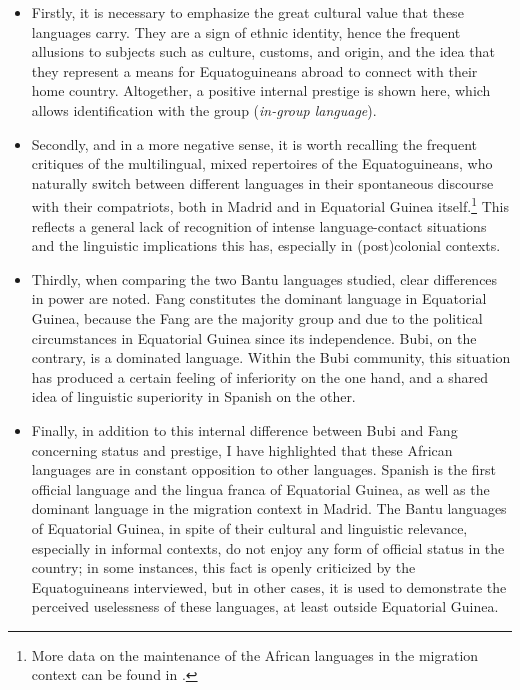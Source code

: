 \documentclass[output=paper]{langscibook}
\begin{document}
\begin{itemize}
\item Firstly, it is necessary to emphasize the great cultural value that these languages carry. They are a sign of ethnic identity, hence the frequent allusions to subjects such as culture, customs, and origin, and the idea that they represent a means for Equatoguineans abroad to connect with their home country. Altogether, a positive internal prestige is shown here, which allows identification with the group (\textit{in-group language}).
\sloppy
\item Secondly, and in a more negative sense, it is worth recalling the frequent critiques of the multilingual, mixed repertoires of the Equatoguineans, who naturally switch between different languages in their spontaneous discourse with their compatriots, both in Madrid and in Equatorial Guinea itself.\footnote{More data on the maintenance of the African languages in the migration context can be found in \citet{schlumpf_african_2020}.} This reflects a general lack of recognition of intense language-contact situations and the linguistic implications this has, especially in (post)colonial contexts.
\item Thirdly, when comparing the two Bantu languages studied, clear differences in power are noted. Fang constitutes the dominant language in Equatorial Guinea, because the Fang are the majority group and due to the political circumstances in Equatorial Guinea since its independence. Bubi, on the contrary, is a dominated language. Within the Bubi community, this situation has produced a certain feeling of inferiority on the one hand, and a shared idea of linguistic superiority in Spanish on the other.
\sloppy
\item Finally, in addition to this internal difference between Bubi and Fang concerning status and prestige, I have highlighted that these African languages are in constant opposition to other languages. Spanish is the first official language and the lingua franca of Equatorial Guinea, as well as the dominant language in the migration context in Madrid. The Bantu languages of Equatorial Guinea, in spite of their cultural and linguistic relevance, especially in informal contexts, do not enjoy any form of official status in the country; in some instances, this fact is openly criticized by the Equatoguineans interviewed, but in other cases, it is used to demonstrate the perceived uselessness of these languages, at least outside Equatorial Guinea.
\end{itemize}
\end{document}
